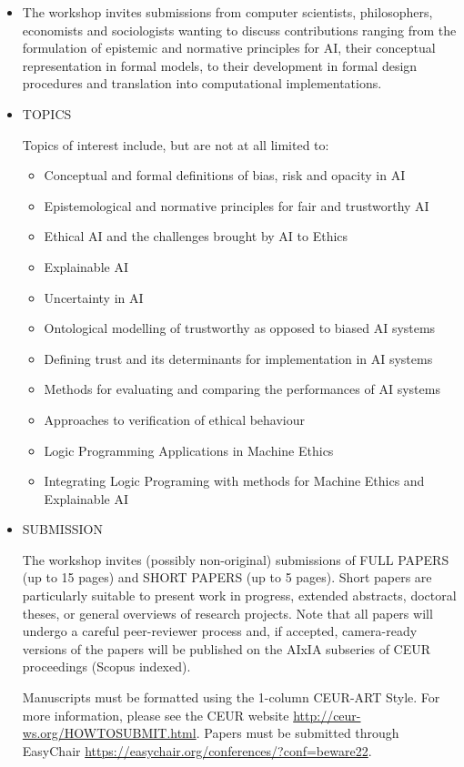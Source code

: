 \documentclass[prodmode,acmtecs]{acmsmall} %
\begin{document}
\begin{itemize}\item  The workshop invites submissions from computer scientists, philosophers, economists and sociologists wanting to discuss contributions ranging from the formulation of epistemic and normative principles for AI, their conceptual representation in formal models, to their development in formal design procedures and translation into computational implementations. 
 
\item  TOPICS  
 
  Topics of interest include, but are not at all limited to: 
 
\begin{itemize}\item  Conceptual and formal definitions of bias, risk and opacity in AI
\item  Epistemological and normative principles for fair and trustworthy AI
\item  Ethical AI and the challenges brought by AI to Ethics
\item  Explainable AI
\item  Uncertainty in AI
\item  Ontological modelling of trustworthy as opposed to biased AI systems
\item  Defining trust and its determinants for implementation in AI systems
\item  Methods for evaluating and comparing the performances of AI systems
\item  Approaches to verification of ethical behaviour
\item  Logic Programming Applications in Machine Ethics
\item  Integrating Logic Programing with methods for Machine Ethics and Explainable AI
\end{itemize} 
\item  SUBMISSION 
 
  The workshop invites (possibly non-original) submissions of FULL PAPERS (up to 15 pages) and SHORT PAPERS (up to 5 pages). Short papers are particularly suitable to present work in progress, extended abstracts, doctoral theses, or general overviews of research projects. Note that all papers will undergo a careful peer-reviewer process and, if accepted, camera-ready versions of the papers will be published on the AIxIA subseries of CEUR proceedings (Scopus indexed). 
 
  Manuscripts must be formatted using the 1-column CEUR-ART Style. For more information, please see the CEUR website \href{http://ceur-ws.org/HOWTOSUBMIT.html}{http://ceur-ws.org/HOWTOSUBMIT.html}. Papers must be submitted through EasyChair \href{https://easychair.org/conferences/?conf=beware22}{https://easychair.org/conferences/?conf=beware22}. 
 

\end{itemize}
\end{document}
